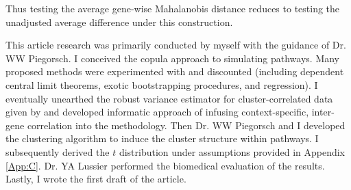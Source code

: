 \noindent Thus testing the average gene-wise Mahalanobis distance reduces to testing the unadjusted average difference under this construction.

This article research was primarily conducted by myself with the guidance of Dr. WW Piegorsch. I conceived the copula approach to simulating pathways. Many proposed methods were experimented with and discounted (including dependent central limit theorems, exotic bootstrapping procedures, and regression). I eventually unearthed the robust variance estimator for cluster-correlated data given by \citet{Williams2000} and developed informatic approach of infusing context-specific, inter-gene correlation into the methodology. Then Dr. WW Piegorsch and I developed the clustering algorithm to induce the cluster structure within pathways. I subsequently derived the $t$ distribution under assumptions provided in Appendix \ref{App:C}. Dr. YA Lussier performed the biomedical evaluation of the results. Lastly, I wrote the first draft of the article.
